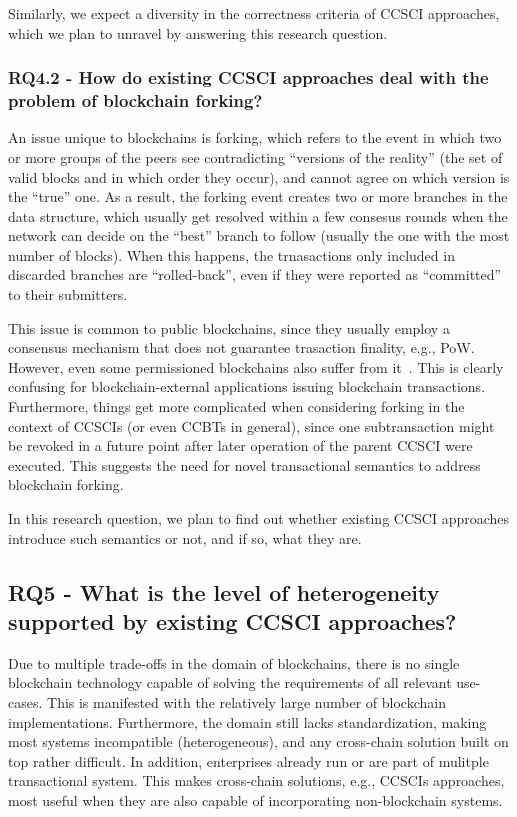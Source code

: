 \documentclass[review]{elsarticle}
\begin{document}
Similarly, we expect a diversity in the correctness criteria of CCSCI approaches, which we plan to unravel by answering this research question.

\subsubsection*{RQ4.2 - How do existing CCSCI approaches deal with the problem of blockchain forking?}
An issue unique to blockchains is forking, which refers to the event in which two or more groups of the peers see contradicting \enquote{versions of the reality} (the set of valid blocks and in which order they occur), and cannot agree on which version is the \enquote{true} one.
As a result, the forking event creates two or more branches in the data structure, which usually get resolved within a few consesus rounds when the network can decide on the \enquote{best} branch to follow (usually the one with the most number of blocks).
When this happens, the trnasactions only included in discarded branches are \enquote{rolled-back}, even if they were reported as \enquote{committed} to their submitters.

This issue is common to public blockchains, since they usually employ a consensus mechanism that does not guarantee trasaction finality, e.g., PoW.
However, even some permissioned blockchains also suffer from it~\cite{cachin2017consensus}.
This is clearly confusing for blockchain-external applications issuing blockchain transactions.
Furthermore, things get more complicated when considering forking in the context of CCSCIs (or even CCBTs in general), since one subtransaction might be revoked in a future point after later operation of the parent CCSCI were executed.
This suggests the need for novel transactional semantics to address blockchain forking.

In this research question, we plan to find out whether existing CCSCI approaches introduce such semantics or not, and if so, what they are.

\subsection*{RQ5 - What is the level of heterogeneity supported by existing CCSCI approaches?}
Due to multiple trade-offs in the domain of blockchains, there is no single blockchain technology capable of solving the requirements of all relevant use-cases.
This is manifested with the relatively large number of blockchain implementations.
Furthermore, the domain still lacks standardization, making most systems incompatible (heterogeneous), and any cross-chain solution built on top rather difficult.
In addition, enterprises already run or are part of mulitple transactional system.
This makes cross-chain solutions, e.g., CCSCIs approaches, most useful when they are also capable of incorporating non-blockchain systems.
\end{document}
